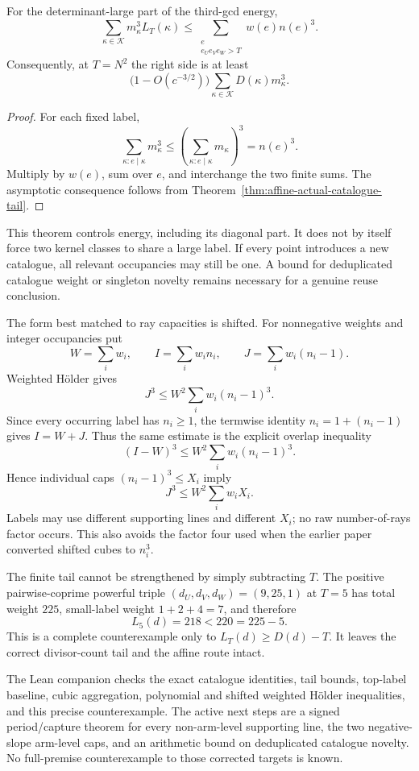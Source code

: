 \begin{theorem}
\label{thm:affine-monotone-catalogue-aggregation}
For the determinant-large part of the third-gcd energy,
\[
 \sum_{\kappa\in\mathcal K}m_\kappa^3L_T(\kappa)
 \le
 \sum_{\substack{e\\e_Ue_Ve_W>T}}w(e)n(e)^3.
\]
Consequently, at $T=N^2$ the right side is at least
\[
 \bigl(1-O(c^{-3/2})\bigr)
 \sum_{\kappa\in\mathcal K}D(\kappa)m_\kappa^3.
\]
\end{theorem}

\begin{proof}
For each fixed label,
\[
 \sum_{\kappa:e\mid\kappa}m_\kappa^3
 \le
 \left(\sum_{\kappa:e\mid\kappa}m_\kappa\right)^3=n(e)^3.
\]
Multiply by $w(e)$, sum over $e$, and interchange the two finite sums.  The
asymptotic consequence follows from Theorem~\ref{thm:affine-actual-catalogue-tail}.
\end{proof}

This theorem controls energy, including its diagonal part.  It does not by
itself force two kernel classes to share a large label.  If every point
introduces a new catalogue, all relevant occupancies may still be one.  A
bound for deduplicated catalogue weight or singleton novelty remains
necessary for a genuine reuse conclusion.

The form best matched to ray capacities is shifted.  For nonnegative
weights and integer occupancies put
\[
 W=\sum_iw_i,\qquad I=\sum_iw_in_i,\qquad
 J=\sum_iw_i(n_i-1).
\]
Weighted H\"older gives
\[
 J^3\le W^2\sum_iw_i(n_i-1)^3.
\]
Since every occurring label has $n_i\ge1$, the termwise identity
$n_i=1+(n_i-1)$ gives $I=W+J$.  Thus the same estimate is the explicit
overlap inequality
\[
 (I-W)^3\le W^2\sum_iw_i(n_i-1)^3.
\]
Hence individual caps $(n_i-1)^3\le X_i$ imply
\[
                         J^3\le W^2\sum_iw_iX_i.
\]
Labels may use different supporting lines and different $X_i$; no raw
number-of-rays factor occurs.  This also avoids the factor four used when
the earlier paper converted shifted cubes to $n_i^3$.

The finite tail cannot be strengthened by simply subtracting $T$.  The
positive pairwise-coprime powerful triple
$(d_U,d_V,d_W)=(9,25,1)$ at $T=5$ has total weight $225$, small-label weight
$1+2+4=7$, and therefore
\[
                         L_5(d)=218<220=225-5.
\]
This is a complete counterexample only to $L_T(d)\ge D(d)-T$.  It leaves the
correct divisor-count tail and the affine route intact.

The Lean companion checks the exact catalogue identities, tail bounds,
top-label baseline, cubic aggregation, polynomial and shifted weighted
H\"older inequalities, and this precise counterexample.  The active next
steps are a signed period/capture theorem for every non-arm-level supporting
line, the two negative-slope arm-level caps, and an arithmetic bound on
deduplicated catalogue novelty.  No full-premise counterexample to those
corrected targets is known.
